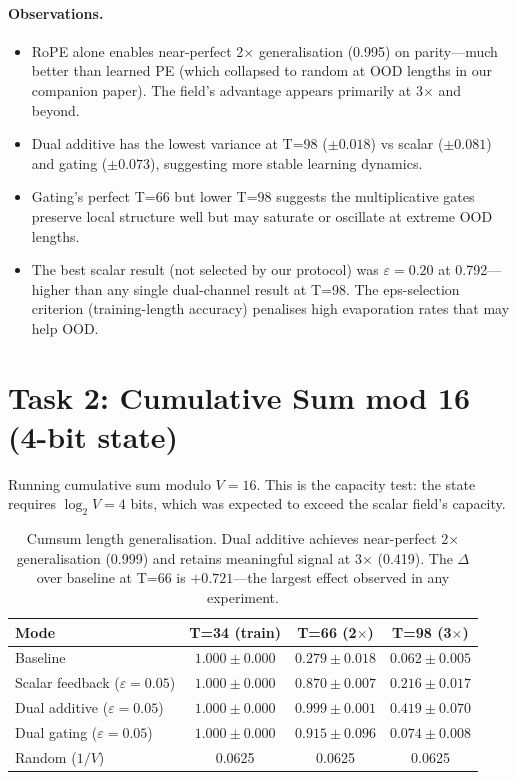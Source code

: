 \documentclass[11pt,a4paper]{article}
\begin{document}
\paragraph{Observations.}
\begin{itemize}
    \item RoPE alone enables near-perfect 2$\times$ generalisation
          (0.995) on parity---much better than learned PE (which
          collapsed to random at OOD lengths in our companion paper).
          The field's advantage appears primarily at 3$\times$ and
          beyond.
    \item Dual additive has the lowest variance at T=98
          ($\pm 0.018$) vs scalar ($\pm 0.081$) and gating
          ($\pm 0.073$), suggesting more stable learning dynamics.
    \item Gating's perfect T=66 but lower T=98 suggests the
          multiplicative gates preserve local structure well but may
          saturate or oscillate at extreme OOD lengths.
    \item The best scalar result (not selected by our protocol) was
          $\varepsilon\!=\!0.20$ at 0.792---higher than any
          single dual-channel result at T=98.  The eps-selection
          criterion (training-length accuracy) penalises high
          evaporation rates that may help OOD.
\end{itemize}


\section{Task 2: Cumulative Sum mod 16 (4-bit state)}

Running cumulative sum modulo $V\!=\!16$.  This is the capacity
test: the state requires $\log_2 V = 4$ bits, which was expected to
exceed the scalar field's capacity.

\begin{table}[h]
\centering
\begin{tabular}{@{}lccc@{}}
\toprule
\textbf{Mode} & \textbf{T=34 (train)} & \textbf{T=66 (2$\times$)}
& \textbf{T=98 (3$\times$)} \\
\midrule
Baseline & $1.000 \pm 0.000$ & $0.279 \pm 0.018$
& $0.062 \pm 0.005$ \\
Scalar feedback ($\varepsilon\!=\!0.05$) & $1.000 \pm 0.000$
& $0.870 \pm 0.007$ & $0.216 \pm 0.017$ \\
Dual additive ($\varepsilon\!=\!0.05$) & $1.000 \pm 0.000$
& $\mathbf{0.999 \pm 0.001}$ & $\mathbf{0.419 \pm 0.070}$ \\
Dual gating ($\varepsilon\!=\!0.05$) & $1.000 \pm 0.000$
& $0.915 \pm 0.096$ & $0.074 \pm 0.008$ \\
\addlinespace
Random ($1/V$) & 0.0625 & 0.0625 & 0.0625 \\
\bottomrule
\end{tabular}
\caption{Cumsum length generalisation.  Dual additive achieves
near-perfect 2$\times$ generalisation (0.999) and retains
meaningful signal at 3$\times$ (0.419).  The $\Delta$ over baseline
at T=66 is $+0.721$---the largest effect observed in any experiment.}
\label{tab:cumsum}
\end{table}
\end{document}
